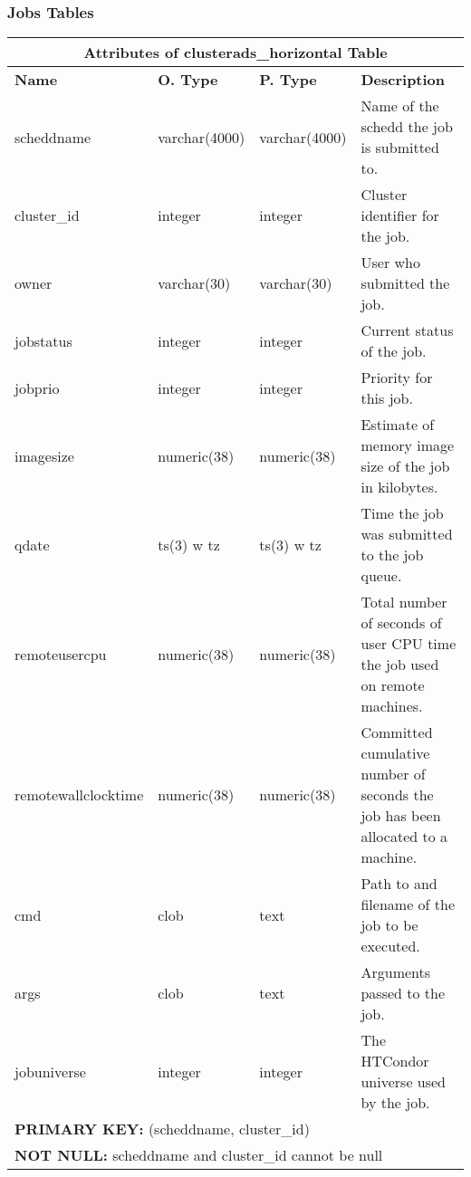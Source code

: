 \subsubsection{Jobs Tables}
\begin{center}
  \begin{tabular}{|l|l|l|p{2.6in}|}\hline
    \multicolumn{4}{|c|}{\textbf{Attributes of clusterads\_horizontal Table}}\\ \hline
    \textbf{Name} & \textbf{O. Type} & \textbf{P. Type} & \textbf{Description}\\ \hline
    scheddname & varchar(4000) & varchar(4000) & Name of the schedd the job is submitted to.\\ \hline
    cluster\_id & integer & integer & Cluster identifier for the job.\\ \hline
    owner & varchar(30) & varchar(30) & User who submitted the job.\\ \hline
    jobstatus & integer & integer & Current status of the job.\\ \hline
    jobprio & integer & integer & Priority for this job.\\ \hline
    imagesize & numeric(38) & numeric(38) & Estimate of memory image size of the job in kilobytes.\\ \hline
    qdate & ts(3) w tz & ts(3) w tz & Time the job was submitted to the job queue.\\ \hline
    remoteusercpu & numeric(38) & numeric(38) & Total number of seconds of user CPU time the job used on remote machines.\\ \hline
    remotewallclocktime & numeric(38) & numeric(38) & Committed cumulative number of seconds the job has been allocated to a machine.\\ \hline
    cmd & clob & text & Path to and filename of the job to be executed.\\ \hline
    args & clob & text & Arguments passed to the job.\\ \hline
    jobuniverse & integer & integer & The HTCondor universe used by the job.\\ \hline
    \multicolumn{4}{|l|}{\textbf{PRIMARY KEY:} (scheddname, cluster\_id)} \\ \hline
    \multicolumn{4}{|l|}{\textbf{NOT NULL:} scheddname and cluster\_id cannot be null} \\ \hline
  \end{tabular}
\vspace{24pt}


\end{center}
